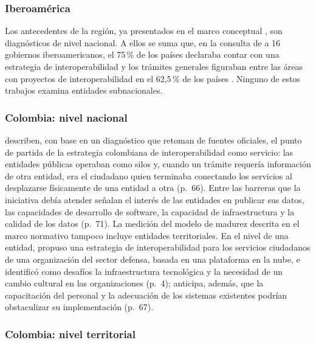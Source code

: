 \subsubsection{Iberoamérica}

Los antecedentes de la región, ya presentados en el marco conceptual \parencites{criado2011interoperabilidad}{roseth2018potencial}, son diagnósticos de nivel nacional. A ellos se suma que, en la consulta de \textcite{criado2011interoperabilidad} a 16 gobiernos iberoamericanos, el 75\,\% de los países declaraba contar con una estrategia de interoperabilidad y los trámites generales figuraban entre las áreas con proyectos de interoperabilidad en el 62,5\,\% de los países . Ninguno de estos trabajos examina entidades subnacionales.

\subsubsection{Colombia: nivel nacional}

\textcite{moralesmoreno2015interoperability} describen, con base en un diagnóstico que retoman de fuentes oficiales, el punto de partida de la estrategia colombiana de interoperabilidad como servicio: las entidades públicas operaban como silos y, cuando un trámite requería información de otra entidad, era el ciudadano quien terminaba conectando los servicios al desplazarse físicamente de una entidad a otra (p.~66). Entre las barreras que la iniciativa debía atender señalan el interés de las entidades en publicar sus datos, las capacidades de desarrollo de software, la capacidad de infraestructura y la calidad de los datos (p.~71). La medición del modelo de madurez descrita en el marco normativo tampoco incluye entidades territoriales. En el nivel de una entidad, \textcite{molina2025propuesta} propuso una estrategia de interoperabilidad para los servicios ciudadanos de una organización del sector defensa, basada en una plataforma en la nube, e identificó como desafíos la infraestructura tecnológica y la necesidad de un cambio cultural en las organizaciones (p.~4); anticipa, además, que la capacitación del personal y la adecuación de los sistemas existentes podrían obstaculizar su implementación (p.~67).

\subsubsection{Colombia: nivel territorial}

